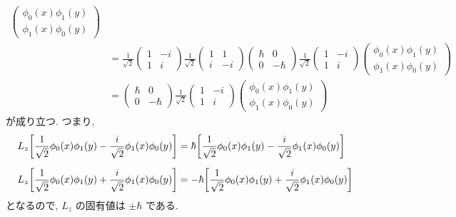 \documentclass[../../ou-physics-exam.tex]{subfiles}
\begin{document}
\begin{answer}
\begin{align*}
\begin{pmatrix}
            \phi_0 (x) \phi_1 (y) \\
            \phi_1 (x) \phi_0 (y)
        \end{pmatrix} \\[2mm]
        & = \frac{1}{\sqrt{2}} 
        \begin{pmatrix}
            1 & -i \\
            1 & i
        \end{pmatrix}
        \frac{1}{\sqrt{2}}
        \begin{pmatrix}
            1 & 1 \\
            i & -i
        \end{pmatrix}
        \begin{pmatrix}
            \hbar & 0 \\
            0 & - \hbar
        \end{pmatrix}
        \frac{1}{\sqrt{2}} 
        \begin{pmatrix}
            1 & -i \\
            1 & i
        \end{pmatrix}
        \begin{pmatrix}
            \phi_0 (x) \phi_1 (y) \\
            \phi_1 (x) \phi_0 (y)
        \end{pmatrix} \\[2mm]
        & = 
        \begin{pmatrix}
            \hbar & 0 \\
            0 & - \hbar
        \end{pmatrix}
        \frac{1}{\sqrt{2}} 
        \begin{pmatrix}
            1 & -i \\
            1 & i
        \end{pmatrix}
        \begin{pmatrix}
            \phi_0 (x) \phi_1 (y) \\
            \phi_1 (x) \phi_0 (y)
        \end{pmatrix}
    \end{align*}
    が成り立つ. 
    つまり,
    \begin{align*}
        & L_z \qty[\frac{1}{\sqrt{2}} \phi_0 (x) \phi_1 (y) - \frac{i}{\sqrt{2}} \phi_1 (x) \phi_0 (y)] = \hbar \qty[\frac{1}{\sqrt{2}} \phi_0 (x) \phi_1 (y) - \frac{i}{\sqrt{2}} \phi_1 (x) \phi_0 (y)] \\[2mm]
        & L_z \qty[\frac{1}{\sqrt{2}} \phi_0 (x) \phi_1 (y) + \frac{i}{\sqrt{2}} \phi_1 (x) \phi_0 (y)] = - \hbar \qty[\frac{1}{\sqrt{2}} \phi_0 (x) \phi_1 (y) + \frac{i}{\sqrt{2}} \phi_1 (x) \phi_0 (y)]
    \end{align*}
    となるので, $ L_z $ の固有値は $ \pm \hbar $ である.
\end{answer}
\end{document}
